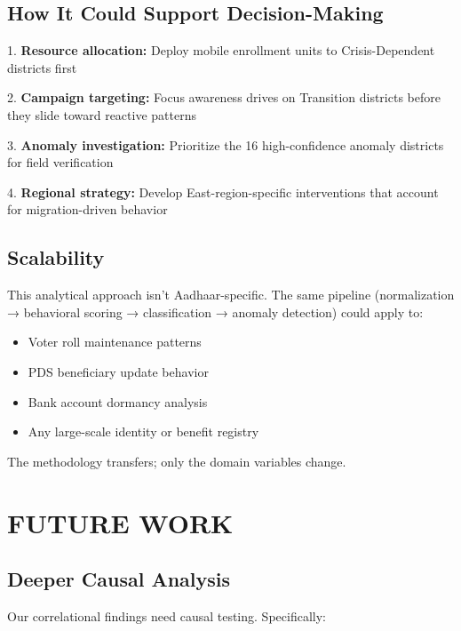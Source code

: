 \documentclass[11pt, a4paper]{article}
\begin{document}
\subsection{How It Could Support Decision-Making}

1.  \textbf{Resource allocation:} Deploy mobile enrollment units to Crisis-Dependent districts first

2.  \textbf{Campaign targeting:} Focus awareness drives on Transition districts before they slide toward reactive patterns

3.  \textbf{Anomaly investigation:} Prioritize the 16 high-confidence anomaly districts for field verification

4.  \textbf{Regional strategy:} Develop East-region-specific interventions that account for migration-driven behavior


\subsection{Scalability}

This analytical approach isn't Aadhaar-specific. The same pipeline (normalization → behavioral scoring → classification → anomaly detection) could apply to:


\begin{itemize}
\item Voter roll maintenance patterns

\item PDS beneficiary update behavior

\item Bank account dormancy analysis

\item Any large-scale identity or benefit registry
\end{itemize}

The methodology transfers; only the domain variables change.




\section{FUTURE WORK}

\subsection{Deeper Causal Analysis}

Our correlational findings need causal testing. Specifically:
\end{document}
